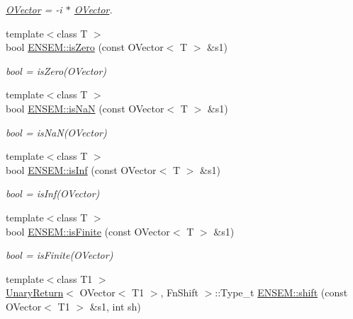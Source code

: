 \begin{DoxyCompactItemize}
\begin{DoxyCompactList}\small\item\em \mbox{\hyperlink{classENSEM_1_1OVector}{O\+Vector}} = -\/i $\ast$ \mbox{\hyperlink{classENSEM_1_1OVector}{O\+Vector}}. \end{DoxyCompactList}\item 
{\footnotesize template$<$class T $>$ }\\bool \mbox{\hyperlink{group__obsvector_gaba334c166dc76f5d8390574d1ea1a936}{E\+N\+S\+E\+M\+::is\+Zero}} (const O\+Vector$<$ T $>$ \&s1)
\begin{DoxyCompactList}\small\item\em bool = is\+Zero(\+O\+Vector) \end{DoxyCompactList}\item 
{\footnotesize template$<$class T $>$ }\\bool \mbox{\hyperlink{group__obsvector_ga2f554e602e9adc3c7d908a9f9518af6e}{E\+N\+S\+E\+M\+::is\+NaN}} (const O\+Vector$<$ T $>$ \&s1)
\begin{DoxyCompactList}\small\item\em bool = is\+Na\+N(\+O\+Vector) \end{DoxyCompactList}\item 
{\footnotesize template$<$class T $>$ }\\bool \mbox{\hyperlink{group__obsvector_ga4faba5244cb224511d1944e1cc99b2db}{E\+N\+S\+E\+M\+::is\+Inf}} (const O\+Vector$<$ T $>$ \&s1)
\begin{DoxyCompactList}\small\item\em bool = is\+Inf(\+O\+Vector) \end{DoxyCompactList}\item 
{\footnotesize template$<$class T $>$ }\\bool \mbox{\hyperlink{group__obsvector_ga4955ee051f997aca2666a9361dcb7861}{E\+N\+S\+E\+M\+::is\+Finite}} (const O\+Vector$<$ T $>$ \&s1)
\begin{DoxyCompactList}\small\item\em bool = is\+Finite(\+O\+Vector) \end{DoxyCompactList}\item 
{\footnotesize template$<$class T1 $>$ }\\\mbox{\hyperlink{structUnaryReturn}{Unary\+Return}}$<$ O\+Vector$<$ T1 $>$, Fn\+Shift $>$\+::Type\+\_\+t \mbox{\hyperlink{group__obsvector_ga0f56d530ee90cdb061c1aeff65389a61}{E\+N\+S\+E\+M\+::shift}} (const O\+Vector$<$ T1 $>$ \&s1, int sh)
\item 

\end{DoxyCompactItemize}
